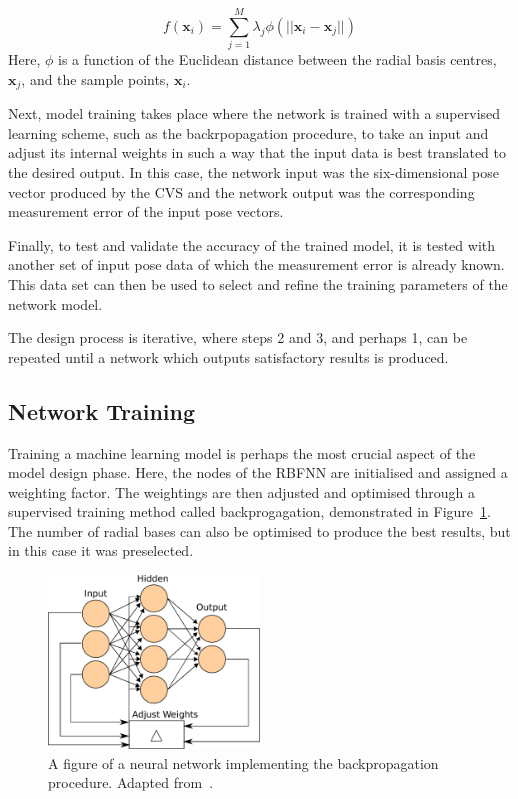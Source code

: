 \begin{equation}
  \label{eq:chap4-rbf}
  f(\bm{x}_i) = \sum\limits_{j = 1}^{M}\lambda_j \phi(|| \bm{x}_i - \bm{x}_j ||)
\end{equation}
Here, $\phi$ is a function of the Euclidean distance between the radial basis centres, $\bm{x}_j$, and the sample points, $\bm{x}_i$.

Next, model training takes place where the network is trained with a supervised learning scheme, such as the backrpopagation procedure, to take an input and adjust its internal weights in such a way that the input data is best translated to the desired output. In this case, the network input was the six-dimensional pose vector produced by the CVS and the network output was the corresponding measurement error of the input pose vectors.  

Finally, to test and validate the accuracy of the trained model, it is tested with another set of input pose data of which the measurement error is already known. This data set can then be used to select and refine the training parameters of the network model. 

The design process is iterative, where steps 2 and 3, and perhaps 1, can be repeated until a network which outputs satisfactory results is produced. 

\subsection{Network Training}

Training a machine learning model is perhaps the most crucial aspect of the model design phase. Here, the nodes of the RBFNN are initialised and assigned a weighting factor. The weightings are then adjusted and optimised through a supervised training method called backprogagation, demonstrated in Figure~\ref{fig:chap4-backprogagation}. The number of radial bases can also be optimised to produce the best results, but in this case it was preselected. 

\begin{figure}
  \centering
  \includegraphics[width=0.5\textwidth]{figures/chapter4/backpropagation}
  \caption[A neural network implementing the backpropagation procedure.]{A figure of a neural network implementing the backpropagation procedure. Adapted from~\cite{ann-wiki-pic}.}
\label{fig:chap4-backprogagation}
\end{figure}

